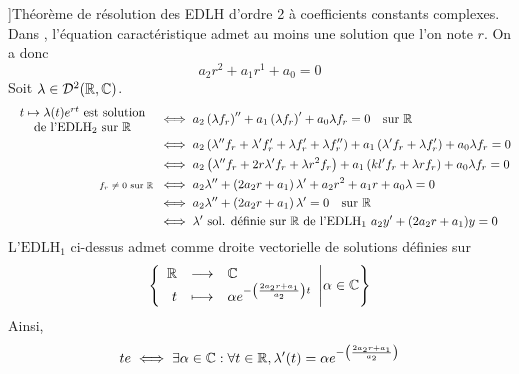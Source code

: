 \documentclass{article}
\begin{document}
\begin{question_kholle}
{  }]{Théorème de résolution des EDLH d'ordre 2 à coefficients constants complexes.}
  Dans \C, l’équation caractéristique admet au moins une solution que l’on note $r$. On a donc
  \[
    a_{2}r^{2} + a_{1}r^{1}+a_{0}=0
  \]
  Soit $\lambda\in\mathcal{D}^{2}(\mathbb R, \mathbb C)$.
  \begin{align}
    \parbox{12em}{\centering$t\mapsto \lambda(t) e^{rt}$ est solution                                                                                                                                                                                            \\ de l’$\mathrm{EDLH_{2}}$ sur \R} & \iff a_{2} \left(\lambda f_{r}\right)'' + a_{1} \left(\lambda f_{r}\right)' + a_{0} \lambda f_{r} = 0 \quad\text{sur } \R \nonumber \\
                                            & \iff a_{2} \left(\lambda'' f_{r} + \lambda' f_{r}' + \lambda f_{r}' + \lambda f_{r}''\right) + a_{1} \left(\lambda' f_{r} + \lambda f_{r}'\right) + a_{0} \lambda f_{r} = 0                              \nonumber \\
                                            & \iff a_{2} \left(\lambda'' f_{r} + 2r \lambda' f_{r} + \lambda r^{2} f_{r}\right) + a_{1} \left(kl' f_{r} + \lambda r f_{r}\right)+ a_{0} \lambda f_{r} = 0                                     \nonumber          \\
    \text{\scriptsize $f_{r}\neq 0$ sur \R} & \iff a_{2} \lambda'' + \left(2a_{2}r + a_{1}\right)\lambda' + a_{2}r^{2} + a_{1}r + a_{0}\lambda = 0                                                                                  \nonumber                    \\
                                            & \iff a_{2} \lambda'' + \left(2a_{2}r +a_{1}\right)\lambda' = 0 \quad\text{sur } \R                                                                                          \nonumber                              \\
                                            & \iff \lambda' \text{ sol. définie sur \R de l'$\mathrm{EDLH_{1}}$ } a_{2}y' + (2a_{2}r + a_{1})y=0 \label{s7:q2:1}
  \end{align}
  L'$\mathrm{EDLH_{1}}$ ci-dessus admet comme droite vectorielle de solutions définies sur \R
  \[
    \left\{\begin{array}{rcl} \mathbb R & \longrightarrow & \mathbb C \\ t & \longmapsto & \alpha e^{-\left(\frac{2a_{2}r+a_{1}}{a_{2}}\right)t} \end{array} \middle | \alpha\in\mathbb C\right\}
  \]
  Ainsi,
  \begin{align*}
    te & \iff \exists \alpha\in\C: \forall t\in\R, \lambda'(t)=\alpha e^{-\left(\frac{2a_{2}r + a_{1}}{a_{2}}\right)}                                                                                                                                                 \\

\end{align*}
\end{question_kholle}
\end{document}

